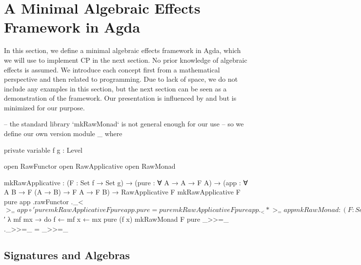 \section{A Minimal Algebraic Effects Framework in Agda}

In this section, we define a minimal algebraic effects framework in Agda, which we will use to implement CP in the next section.
%
No prior knowledge of algebraic effects is assumed.
%
We introduce each concept first from a mathematical perspective and then related to programming.
%
Due to lack of space, we do not include any examples in this section, but the next section can be seen as a demonstration of the framework.
%
Our presentation is influenced by \citet{bauer-2019} and \citet{kidney-2023} but is minimized for our purpose.


\begin{code}[hide]
-- the standard library `mkRawMonad` is not general enough for our use
-- so we define our own version
module _ where

  private
    variable
      f g : Level

  open RawFunctor
  open RawApplicative
  open RawMonad

  mkRawApplicative :
    (F : Set f → Set g) →
    (pure : ∀ {A} → A → F A) →
    (app : ∀ {A B} → F (A → B) → F A → F B) →
    RawApplicative F
  mkRawApplicative F pure app .rawFunctor ._<$>_ = app ∘′ pure
  mkRawApplicative F pure app .pure = pure
  mkRawApplicative F pure app ._<*>_ = app

  mkRawMonad :
    (F : Set f → Set g) →
    (pure : ∀ {A} → A → F A) →
    (bind : ∀ {A B} → F A → (A → F B) → F B) →
    RawMonad F
  mkRawMonad F pure _>>=_ .rawApplicative =
    mkRawApplicative _ pure $′ λ mf mx → do
      f ← mf
      x ← mx
      pure (f x)
  mkRawMonad F pure _>>=_ ._>>=_ = _>>=_
\end{code}

\subsection{Signatures and Algebras}

